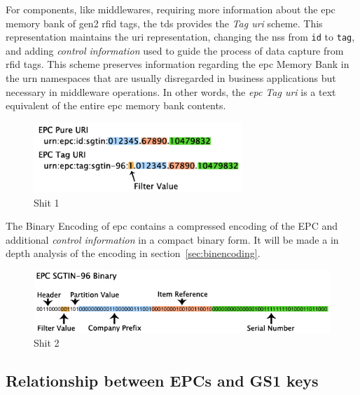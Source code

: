 For components, like middlewares, requiring more information about the \ac{epc} memory bank of \ac{gen2} \ac{rfid} tags, the \ac{tds} provides the \emph{Tag \ac{uri}} scheme.
This representation maintains the \ac{uri} representation, changing the \ac{nss} from \texttt{id} to \texttt{tag}, and adding \textit{control information} used to guide the process of data capture from \ac{rfid} tags.
This scheme preserves information regarding the \ac{epc} Memory Bank in the \ac{urn} namespaces that are usually disregarded in business applications but necessary in middleware operations.
In other words, the \emph{\ac{epc} Tag \ac{uri}} is a text equivalent of the entire \ac{epc} memory bank contents.

\begin{figure}[!ht]
    \centering
    \includegraphics[width=0.7\textwidth]{./figs/02-state-of-the-art/SGTIN_First2encodings.jpg}
    \caption{Shit 1~\cite{SGTININFO}} 
    \label{fig:1111}
\end{figure}

The Binary Encoding of \ac{epc} contains a compressed encoding of the EPC and additional \textit{control information} in a compact binary form.
It will be made a in depth analysis of the encoding in section~\ref{sec:binencoding}.

\begin{figure}[!ht]
    \centering
    \includegraphics[width=\textwidth]{./figs/02-state-of-the-art/SGTIN_binaryconv2.jpg}
    \caption{Shit 2~\cite{SGTININFO}} 
    \label{fig:2222}
\end{figure}

\subsection{Relationship between EPCs and GS1 keys}

